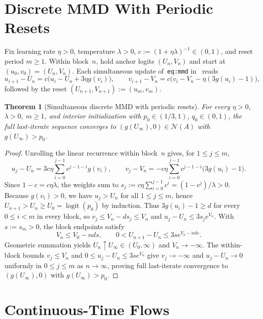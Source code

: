 \documentclass[11pt]{article}
\theoremstyle{plain}
\newtheorem{theorem}{Theorem}
\theoremstyle{definition}
\theoremstyle{remark}
\DeclareMathOperator{\logit}{logit}
\newcommand{\NE}{\mathcal{N}}
\begin{document}
\section{Discrete MMD With Periodic Resets}

Fix learning rate $\eta > 0$, temperature $\lambda > 0$, $c := (1 + \eta\lambda)^{-1} \in (0, 1)$, and reset period $m \ge 1$. Within block~$n$, hold anchor logits $(U_n, V_n)$ and start at $(u_0, v_0) = (U_n, V_n)$. Each simultaneous update of~\texttt{eq:mmd} in~\cite{Leal2026} reads
\[
u_{i+1} - U_n = c\bigl(u_i - U_n + 3\eta g(v_i)\bigr), \qquad
v_{i+1} - V_n = c\bigl(v_i - V_n - \eta(3g(u_i) - 1)\bigr),
\]
followed by the reset $(U_{n+1}, V_{n+1}) := (u_m, v_m)$.

\begin{theorem}[Simultaneous discrete MMD with periodic resets]\label{thm:discrete}
For every $\eta > 0$, $\lambda > 0$, $m \ge 1$, and interior initialization with $p_0 \in (1/3, 1)$, $q_0 \in (0, 1)$, the full last-iterate sequence converges to $(g(U_\infty), 0) \in \NE(A)$ with $g(U_\infty) > p_0$.
\end{theorem}

\begin{proof}
Unrolling the linear recurrence within block~$n$ gives, for $1 \le j \le m$,
\[
u_j - U_n = 3c\eta\sum_{i=0}^{j-1} c^{j-1-i} g(v_i), \qquad
v_j - V_n = -c\eta\sum_{i=0}^{j-1} c^{j-1-i}\bigl(3g(u_i) - 1\bigr).
\]
Since $1 - c = c\eta\lambda$, the weights sum to $s_j := c\eta\sum_{i=0}^{j-1} c^i = (1 - c^j)/\lambda > 0$.
Because $g(v_i) > 0$, we have $u_j > U_n$ for all $1 \le j \le m$, hence $U_{n+1} > U_n \ge U_0 = \logit(p_0)$ by induction.
Thus $3g(u_i) - 1 \ge d$ for every $0 \le i < m$ in every block, so $v_j \le V_n - d s_j \le V_n$ and $u_j - U_n \le 3 s_j e^{V_n}$.
With $s := s_m > 0$, the block endpoints satisfy
\[
V_n \le V_0 - n d s, \qquad 0 < U_{n+1} - U_n \le 3s e^{V_0 - n d s}.
\]
Geometric summation yields $U_n \uparrow U_\infty \in (U_0, \infty)$ and $V_n \to -\infty$. The within-block bounds $v_j \le V_n$ and $0 \le u_j - U_n \le 3s e^{V_n}$ give $v_j \to -\infty$ and $u_j - U_n \to 0$ uniformly in $0 \le j \le m$ as $n \to \infty$, proving full last-iterate convergence to $(g(U_\infty), 0)$ with $g(U_\infty) > p_0$.
\end{proof}

\section{Continuous-Time Flows}
\end{document}
